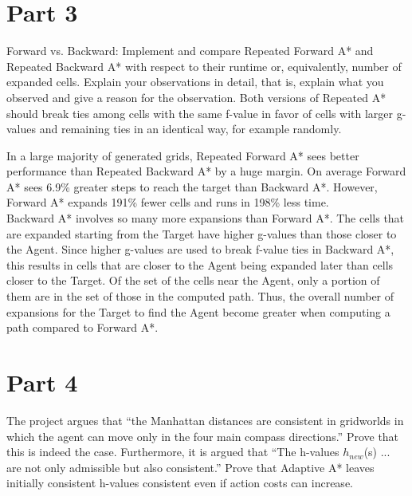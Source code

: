 \documentclass[12pt]{article}
\begin{document}
\section*{Part 3}
  \begin{itshape}
Forward vs. Backward: Implement and compare Repeated Forward A* and Repeated Backward A*
with respect to their runtime or, equivalently, number of expanded cells. Explain your observations in detail, that is, explain
what you observed and give a reason for the observation. Both versions of Repeated A* should break ties among cells with
the same f-value in favor of cells with larger g-values and remaining ties in an identical way, for example randomly.
  \end{itshape}
\begin {flushleft}
In a large majority of generated grids, Repeated Forward A* sees better performance than
Repeated Backward A* by a huge margin. On average Forward A* sees 6.9\% greater steps to
reach the target than Backward A*. However, Forward A* expands 191\% fewer cells and runs in
198\% less time.
\\
\vskip 0.3cm
Backward A* involves so many more expansions than Forward A*. The cells that are expanded
starting from the Target have higher g-values than those closer to the Agent. Since higher
g-values are used to break f-value ties in Backward A*, this results in cells that are closer to the
Agent being expanded later than cells closer to the Target. Of the set of the cells near the
Agent, only a portion of them are in the set of those in the computed path. Thus, the overall
number of expansions for the Target to find the Agent become greater when computing a path
compared to Forward A*.
\end{flushleft}
\section*{Part 4}

        \begin{itshape}
       The project argues that “the Manhattan distances are consistent in gridworlds in which the agent can move only in the four main compass directions.” Prove that this is indeed the case.
\vskip 0.5cm
Furthermore, it is argued that “The h-values 
$h_{new}$(s) ... are not only admissible but also consistent.” Prove that Adaptive A* leaves initially consistent h-values consistent even if action costs can increase.
         \end{itshape}
         
\end{document}
